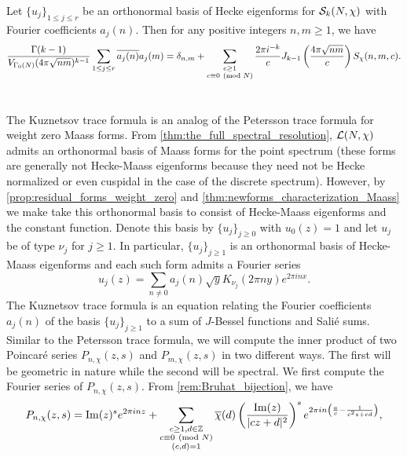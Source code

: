     \begin{theorem}
      Let $\{u_{j}\}_{1 \le j \le r}$ be an orthonormal basis of Hecke eigenforms for $\mathcal{S}_{k}(N,\chi)$ with Fourier coefficients $a_{j}(n)$. Then for any positive integers $n,m \ge 1$, we have
      \[
        \frac{\Gamma(k-1)}{V_{\Gamma_{0}(N)}(4\pi\sqrt{nm})^{k-1}}\sum_{1 \le j \le r}\overline{a_{j}(n)}a_{j}(m) = \delta_{n,m}+\sum_{\substack{c \ge 1 \\ c \equiv 0 \ \left(\text{mod }N\right)}}\frac{2\pi i^{-k}}{c}J_{k-1}\left(\frac{4\pi\sqrt{nm}}{c}\right)S_{\chi}(n,m,c).
      \]
    \end{theorem}
  \section{}
    The Kuznetsov trace formula is an analog of the Petersson trace formula for weight zero Maass forms. From \cref{thm:the_full_spectral_resolution}, $\mathcal{L}(N,\chi)$ admits an orthonormal basis of Maass forms for the point spectrum (these forms are generally not Hecke-Maass eigenforms because they need not be Hecke normalized or even cuspidal in the case of the discrete spectrum). However, by \cref{prop:residual_forms_weight_zero} and \cref{thm:newforms_characterization_Maass} we make take this orthonormal basis to consist of Hecke-Maass eigenforms and the constant function. Denote this basis by $\{u_{j}\}_{j \ge 0}$ with $u_{0}(z) = 1$ and let $u_{j}$ be of type $\nu_{j}$ for $j \ge 1$. In particular, $\{u_{j}\}_{j \ge 1}$ is an orthonormal basis of Hecke-Maass eigenforms and each such form admits a Fourier series
    \[
      u_{j}(z) = \sum_{n \neq 0}a_{j}(n)\sqrt{y}K_{\nu_{j}}(2\pi ny)e^{2\pi inx}.
    \]
    The Kuznetsov trace formula is an equation relating the Fourier coefficients $a_{j}(n)$ of the basis $\{u_{j}\}_{j \ge 1}$ to a sum of $J$-Bessel functions and Sali\'e sums. Similar to the Petersson trace formula, we will compute the inner product of two Poincar\'e series $P_{n,\chi}(z,s)$ and $P_{m,\chi}(z,s)$ in two different ways. The first will be geometric in nature while the second will be spectral. We first compute the Fourier series of $P_{n,\chi}(z,s)$. From \cref{rem:Bruhat_bijection}, we have
    \[
      P_{n,\chi}(z,s) = \mathrm{Im}(z)^{s}e^{2\pi inz}+\sum_{\substack{c \ge 1, d \in \mathbb{Z} \\ c \equiv 0 \ \left(\text{mod }N\right) \\ (c,d) = 1}}\overline{\chi}(d)\left(\frac{\mathrm{Im}(z)}{|cz+d|^{2}}\right)^{s}e^{2\pi in\left(\frac{a}{c}-\frac{1}{c^{2}z+cd}\right)},
    \]
